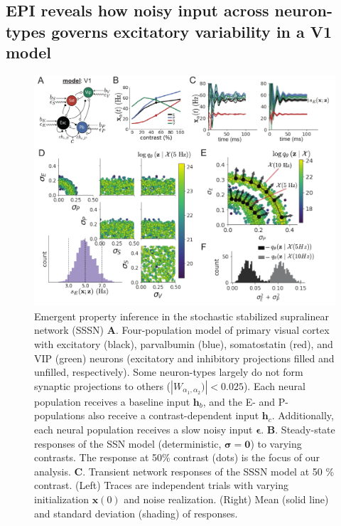 \documentclass[11pt]{article}
\begin{document}
\subsection{EPI reveals how noisy input across neuron-types governs excitatory variability in a V1 model} \label{results_V1}

\begin{figure}
\vspace{-1cm}
\begin{center}
\includegraphics[scale=0.8]{figures/fig2/fig2.pdf}
\end{center}
\vspace{-1cm}
\caption{\small Emergent property inference in the stochastic stabilized supralinear network (SSSN)
\textbf{A}.  Four-population model of primary visual cortex with excitatory (black), parvalbumin (blue), somatostatin (red), and VIP (green) neurons (excitatory and inhibitory projections filled and unfilled, respectively).   
Some neuron-types largely do not form synaptic projections to others ($|W_{\alpha_1, \alpha_2})| < 0.025$).
Each neural population receives a baseline input $\mathbf{h}_b$, and the E- and P-populations also receive a contrast-dependent input $\mathbf{h}_c$.
Additionally, each neural population receives a slow noisy input $\bm{\epsilon}$.
\textbf{B}. Steady-state responses of the SSN model (deterministic, $\bm{\sigma}=\bm{0}$) to varying contrasts.  The response at 50\% contrast (dots) is the focus of our analysis.
\textbf{C}. Transient network responses of the SSSN model at 50 \% contrast. (Left) Traces are independent trials with varying initialization $\mathbf{x}(0)$ and noise realization. (Right) Mean (solid line) and standard deviation (shading) of responses.
}
\end{figure}
\end{document}
